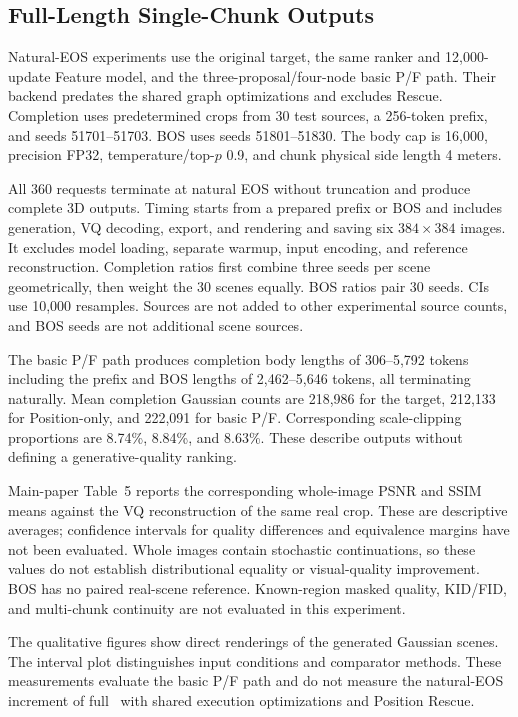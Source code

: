 \subsection{Full-Length Single-Chunk Outputs}
\label{app:natural}
Natural-EOS experiments use the original target, the same ranker and 12,000-update Feature model, and the three-proposal/four-node basic P/F path. Their backend predates the shared graph optimizations and excludes Rescue. Completion uses predetermined crops from 30 test sources, a 256-token prefix, and seeds 51701--51703. BOS uses seeds 51801--51830. The body cap is 16,000, precision FP32, temperature/top-$p$ 0.9, and chunk physical side length 4 meters.

All 360 requests terminate at natural EOS without truncation and produce complete 3D outputs. Timing starts from a prepared prefix or BOS and includes generation, VQ decoding, export, and rendering and saving six $384\times384$ images. It excludes model loading, separate warmup, input encoding, and reference reconstruction. Completion ratios first combine three seeds per scene geometrically, then weight the 30 scenes equally. BOS ratios pair 30 seeds. CIs use 10,000 resamples. Sources are not added to other experimental source counts, and BOS seeds are not additional scene sources.

The basic P/F path produces completion body lengths of 306--5,792 tokens including the prefix and BOS lengths of 2,462--5,646 tokens, all terminating naturally. Mean completion Gaussian counts are 218,986 for the target, 212,133 for Position-only, and 222,091 for basic P/F. Corresponding scale-clipping proportions are 8.74\%, 8.84\%, and 8.63\%. These describe outputs without defining a generative-quality ranking.

Main-paper Table~5 reports the corresponding whole-image PSNR and SSIM means against the VQ reconstruction of the same real crop. These are descriptive averages; confidence intervals for quality differences and equivalence margins have not been evaluated. Whole images contain stochastic continuations, so these values do not establish distributional equality or visual-quality improvement. BOS has no paired real-scene reference. Known-region masked quality, KID/FID, and multi-chunk continuity are not evaluated in this experiment.

The qualitative figures show direct renderings of the generated Gaussian scenes. The interval plot distinguishes input conditions and comparator methods. These measurements evaluate the basic P/F path and do not measure the natural-EOS increment of full \PF\ with shared execution optimizations and Position Rescue.
